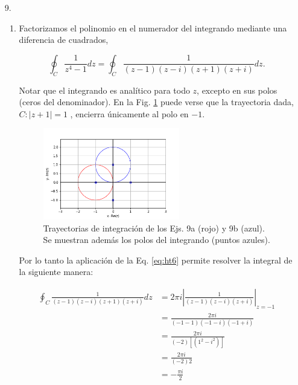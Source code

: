 \documentclass[10pt,a4paper]{article}
\begin{document}
\begin{enumerate}
\item [9.]
\begin{enumerate}
	
	\item Factorizamos el polinomio en el numerador del integrando mediante una 
	diferencia de cuadrados,
	\label{ej:sol9a}
	
	\begin{equation}
	\oint_{C}\frac{1}{z^4-1}dz=\oint_{C}\frac{1}{(z-1)(z-i)(z+1)(z+i)}dz.
	\end{equation}
	
	Notar que el integrando es anal\'itico para todo $z$, excepto en sus polos 
	(ceros del denominador). En la Fig. \ref{fig:sol9} puede verse que la 
	trayectoria dada,  $C:|z+1|=1$ , encierra \'unicamente al polo en $-1$.
	
	\begin{figure}[!htbp]
		\centering
		\includegraphics[width=0.6\textwidth]{tp3_9ab.png}
		\caption{Trayectorias de integraci\'on de los Ejs. 9a (rojo) y 
			9b (azul). Se muestran adem\'as los polos del integrando 
			(puntos azules).}
		\label{fig:sol9}
	\end{figure}
	
	Por lo tanto la aplicaci\'on de la Eq. \ref{eq:ht6} permite resolver la 
	integral de	la siguiente manera:
	
	\begin{equation}
	\begin{split}
	\oint_{C}\frac{1}{(z-1)(z-i)(z+1)(z+i)}dz&=2\pi i \left| 
	\frac{1}{(z-1)(z-i)(z+i)} \right|_{z=-1} \\
	&= \frac{2\pi i}{(-1-1)(-1-i)(-1+i)}  \\
	&=\frac{2\pi i}{(-2)[(1^2-i^2)]}  \\
	&=\frac{2\pi i}{(-2)2}\\ 
	&=\boxed{-\frac{\pi i}{2}}
	\end{split}
	\end{equation}	


\end{enumerate}
\end{enumerate}
\end{document}
